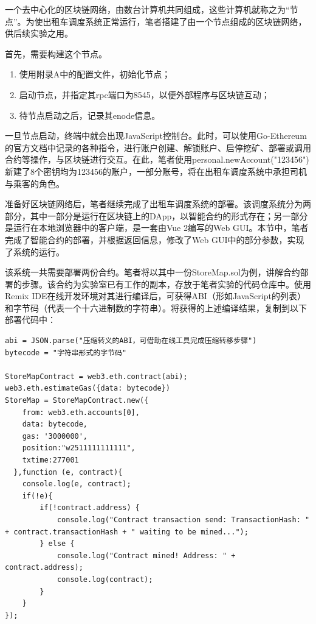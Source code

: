 一个去中心化的区块链网络，由数台计算机共同组成，这些计算机就称之为“节点”。为使出租车调度系统正常运行，笔者搭建了由一个节点组成的区块链网络，供后续实验之用。

首先，需要构建这个节点。

\begin{enumerate}
  \item 使用附录A中的配置文件，初始化节点；
  \item 启动节点，并指定其rpc端口为8545，以便外部程序与区块链互动；
  \item 待节点启动之后，记录其enode信息。
\end{enumerate}

一旦节点启动，终端中就会出现JavaScript控制台。此时，可以使用Go-Ethereum的官方文档中记录的各种指令，进行账户创建、解锁账户、启停挖矿、部署或调用合约等操作，与区块链进行交互。在此，笔者使用personal.newAccount("123456")新建了8个密钥均为123456的账户，一部分账号，将在出租车调度系统中承担司机与乘客的角色。

准备好区块链网络后，笔者继续完成了出租车调度系统的部署。该调度系统分为两部分，其中一部分是运行在区块链上的DApp，以智能合约的形式存在；另一部分是运行在本地浏览器中的客户端，是一套由Vue 2编写的Web GUI。本节中，笔者完成了智能合约的部署，并根据返回信息，修改了Web GUI中的部分参数，实现了系统的运行。

该系统一共需要部署两份合约。笔者将以其中一份StoreMap.sol为例，讲解合约部署的步骤。该合约为实验室已有工作的副本，存放于笔者实验的代码仓库中。使用Remix IDE在线开发环境对其进行编译后，可获得ABI（形如JavaScript的列表）和字节码（代表一个十六进制数的字符串）。将获得的上述编译结果，复制到以下部署代码中：

\begin{lstlisting}[caption={合约部署代码}]
abi = JSON.parse("压缩转义的ABI，可借助在线工具完成压缩转移步骤")
bytecode = "字符串形式的字节码"

StoreMapContract = web3.eth.contract(abi);
web3.eth.estimateGas({data: bytecode})
StoreMap = StoreMapContract.new({
    from: web3.eth.accounts[0],
    data: bytecode,
    gas: '3000000',
    position:"w2511111111111",
    txtime:277001
  },function (e, contract){
    console.log(e, contract);
    if(!e){
        if(!contract.address) {
            console.log("Contract transaction send: TransactionHash: " + contract.transactionHash + " waiting to be mined...");
        } else {
            console.log("Contract mined! Address: " + contract.address);
            console.log(contract);
        }
    }
});
\end{lstlisting}

